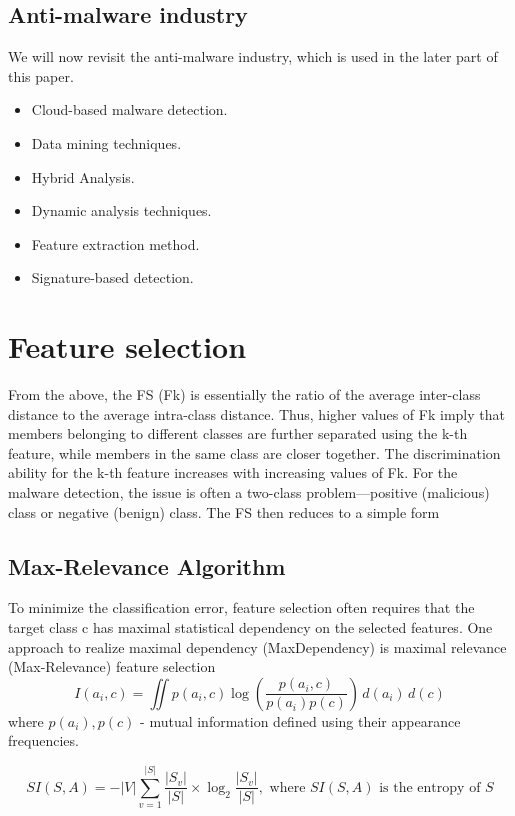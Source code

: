 \documentclass[a4paper, 12pt, oneside]{Thesis}
\begin{document}
\subsection{Anti-malware industry}
We will now revisit the anti-malware industry, which is used in the
later part of this paper.

\begin{itemize}
    \item Cloud-based malware detection.
    \item Data mining techniques.
    \item Hybrid Analysis.
    \item Dynamic analysis techniques.
    \item Feature extraction method.
    \item Signature-based detection.
\end{itemize}


\section{Feature selection} 
\label{Feature selection}
From the above, the FS (Fk) is essentially the ratio of the average inter-class distance to the average intra-class distance. Thus, higher values of Fk imply that members belonging to different classes are further separated using the k-th feature, while members in the same class are closer together. The discrimination ability for the k-th feature increases with increasing values of Fk. For the malware detection, the issue is often a two-class problem—positive (malicious) class or negative (benign) class. The FS then reduces to a simple form
\subsection{Max-Relevance Algorithm}

To minimize the classification error, feature selection often requires that the target class c has maximal statistical dependency on the selected features. One approach to realize maximal dependency (MaxDependency) is maximal relevance (Max-Relevance) feature selection
\begin{equation}
I(a_i, c) = \iint p(a_i, c) \log \left( \frac{p(a_i, c)}{p(a_i) p(c)} \right) \, d(a_i) \, d(c)
\label{mutual_information}
\end{equation}
where \( p(a_i), p(c) \) - mutual information defined using their appearance frequencies.

\begin{equation}
SI(S, A) = - \left| V \right| \sum_{v=1}^{\left| S \right|} \frac{\left| S_v \right|}{\left| S \right|} \times \log_2 \frac{\left| S_v \right|}{\left| S \right|}, \text{ where } SI(S, A) \text{ is the entropy of } S
\label{entropy}
\end{equation}
\end{document}
